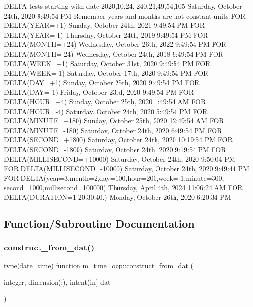 D\+E\+L\+TA tests starting with date 2020,10,24,-\/240,21,49,54,105 Saturday, October 24th, 2020 9\+:49\+:54 PM Remember years and months are not constant units F\+OR D\+E\+L\+TA(Y\+E\+AR=+1) Sunday, October 24th, 2021 9\+:49\+:54 PM F\+OR D\+E\+L\+TA(Y\+E\+AR=-\/1) Thursday, October 24th, 2019 9\+:49\+:54 PM F\+OR D\+E\+L\+TA(M\+O\+N\+TH=+24) Wednesday, October 26th, 2022 9\+:49\+:54 PM F\+OR D\+E\+L\+TA(M\+O\+N\+TH=-\/24) Wednesday, October 24th, 2018 9\+:49\+:54 PM F\+OR D\+E\+L\+TA(W\+E\+EK=+1) Saturday, October 31st, 2020 9\+:49\+:54 PM F\+OR D\+E\+L\+TA(W\+E\+EK=-\/1) Saturday, October 17th, 2020 9\+:49\+:54 PM F\+OR D\+E\+L\+TA(D\+AY=+1) Sunday, October 25th, 2020 9\+:49\+:54 PM F\+OR D\+E\+L\+TA(D\+AY=-\/1) Friday, October 23rd, 2020 9\+:49\+:54 PM F\+OR D\+E\+L\+TA(H\+O\+UR=+4) Sunday, October 25th, 2020 1\+:49\+:54 AM F\+OR D\+E\+L\+TA(H\+O\+UR=-\/4) Saturday, October 24th, 2020 5\+:49\+:54 PM F\+OR D\+E\+L\+TA(M\+I\+N\+U\+TE=+180) Sunday, October 25th, 2020 12\+:49\+:54 AM F\+OR D\+E\+L\+TA(M\+I\+N\+U\+TE=-\/180) Saturday, October 24th, 2020 6\+:49\+:54 PM F\+OR D\+E\+L\+TA(S\+E\+C\+O\+ND=+1800) Saturday, October 24th, 2020 10\+:19\+:54 PM F\+OR D\+E\+L\+TA(S\+E\+C\+O\+ND=-\/1800) Saturday, October 24th, 2020 9\+:19\+:54 PM F\+OR D\+E\+L\+TA(M\+I\+L\+L\+I\+S\+E\+C\+O\+ND=+10000) Saturday, October 24th, 2020 9\+:50\+:04 PM F\+OR D\+E\+L\+TA(M\+I\+L\+L\+I\+S\+E\+C\+O\+ND=-\/10000) Saturday, October 24th, 2020 9\+:49\+:44 PM F\+OR D\+E\+L\+TA(year=3,month=2,day=100,hour=200,week=-\/1,minute=300, second=1000,millisecond=100000) Thursday, April 4th, 2024 11\+:06\+:24 AM F\+OR D\+E\+L\+TA(D\+U\+R\+A\+T\+I\+ON=\textquotesingle{}1-\/20\+:30\+:40.\textquotesingle{}) Monday, October 26th, 2020 6\+:20\+:34 PM 

\subsection{Function/\+Subroutine Documentation}
\mbox{\label{namespacem__time__oop_ae43c4146d74863b5aee027ebc0103f48}} 
\subsubsection{\texorpdfstring{construct\+\_\+from\+\_\+dat()}{construct\_from\_dat()}}
{\footnotesize\ttfamily type(\mbox{\hyperlink{structm__time__oop_1_1date__time}{date\+\_\+time}}) function m\+\_\+time\+\_\+oop\+::construct\+\_\+from\+\_\+dat (\begin{DoxyParamCaption}\item[{integer, dimension(\+:), intent(in)}]{dat }\end{DoxyParamCaption})\hspace{0.3cm}{\ttfamily [private]}}

